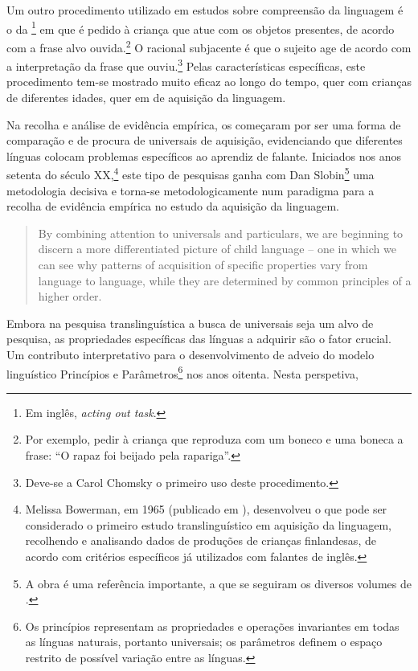 \documentclass[output=paper]{LSP/langsci}
\begin{document}
Um outro procedimento utilizado em estudos sobre compreensão da linguagem é o da \footnote{Em inglês, \emph{acting out task}.} em que é pedido à criança que atue com os objetos presentes, de acordo com a frase alvo ouvida.\footnote{Por exemplo, pedir à criança que reproduza com um boneco e uma boneca a frase: ``O rapaz foi beijado pela rapariga''.} O racional subjacente é que o sujeito age de acordo com a interpretação da frase que ouviu.\footnote{Deve-se a Carol Chomsky \citeyearpar{chomsky1969} o primeiro uso deste procedimento.} Pelas características específicas, este procedimento tem-se mostrado muito eficaz ao longo do tempo, quer com crianças de diferentes idades, quer em  de aquisição da linguagem.

Na recolha e análise de evidência empírica, os  começaram por ser uma forma de comparação e de procura de universais de aquisição, evidenciando que diferentes línguas colocam problemas específicos ao aprendiz de falante. Iniciados nos anos setenta do século XX,\footnote{Melissa Bowerman, em 1965 (publicado em \citeyear{bowerman1973}), desenvolveu o que pode ser considerado o primeiro estudo translinguístico em aquisição da linguagem, recolhendo e analisando dados de produções de crianças finlandesas, de acordo com critérios específicos já utilizados com falantes de inglês.} este tipo de pesquisas ganha com Dan Slobin\footnote{A obra  \citeyearpar{slobin1967} é uma referência importante, a que se seguiram os diversos volumes de  \citeyearpar{slobin1985}.} uma metodologia decisiva e torna-se metodologicamente num paradigma para a recolha de evidência empírica no estudo da aquisição da linguagem.

\begin{quote}
By combining attention to universals and particulars, we are beginning to discern a more differentiated picture of child language – one in which we can see why patterns of acquisition of specific properties vary from language to language, while they are determined by common principles of a higher order.  
\citep[5]{slobin1985}
\end{quote}

Embora na pesquisa translinguística a busca de universais seja um alvo de pesquisa, as propriedades específicas das línguas a adquirir são o fator crucial. Um contributo interpretativo para o desenvolvimento de  adveio do modelo linguístico Princípios e Parâmetros\footnote{Os princípios representam as propriedades e operações invariantes em todas as línguas naturais, portanto universais; os parâmetros definem o espaço restrito de possível variação entre as línguas.} \citep{chomsky1986} nos anos oitenta. Nesta perspetiva,
\end{document}
